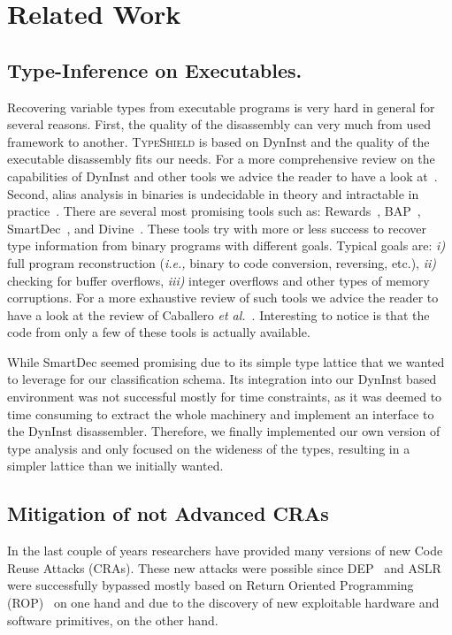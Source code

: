 \section{Related Work}
\label{chapter:Related_Work}

\subsection{Type-Inference on Executables.}
\label{Type-Inference on Executables}
Recovering variable types from executable programs
is very hard in general for several reasons. 
First, the quality of the disassembly can very much from used
framework to another. \textsc{TypeShield} is based on DynInst 
and the quality of the executable disassembly fits our needs. 
For a more comprehensive review on the capabilities of DynInst and other tools we
advice the reader to have a look at~\cite{andriesse:indepth}.
Second, alias analysis in binaries is undecidable in theory and intractable in practice~\cite{alan:mycroft}.
There are several most promising tools such as: Rewards~\cite{lin:rewards}, BAP~\cite{bap:brumley}, 
SmartDec~\cite{fokin:smartdec}, and Divine~\cite{divine:balakrishnan}.
These tools try with more or less success to recover 
type information from binary programs with different goals.
Typical goals are: 
\textit{i)} full program reconstruction (\textit{i.e.,} binary to code conversion, reversing, etc.), 
\textit{ii)} checking for buffer overflows, 
\textit{iii)} integer overflows and other types of memory corruptions.
For a more exhaustive review of such tools we advice the reader to
have a look at the review of Caballero \textit{et al.}~\cite{caballero:inference}.
Interesting to notice is that the code from only a few of these tools is actually available.

While SmartDec seemed promising due to its simple type lattice that we wanted to leverage for our classification schema. 
Its integration into our DynInst based environment was not successful mostly for time constraints, as it was deemed to 
time consuming to extract the whole machinery and implement an interface to the DynInst disassembler.
Therefore, we finally implemented our own version of type analysis and only focused on the wideness of the types, 
resulting in a simpler lattice than we initially wanted.

\subsection{Mitigation of not Advanced CRAs}
\label{Mitigation of Code-Reuse Attacks}
In the last couple of years researchers have provided many versions of new Code Reuse Attacks (CRAs).
These new attacks were possible since DEP~\cite{dep} and ASLR~\cite{ASLR} were successfully bypassed mostly based
on Return Oriented Programming (ROP)~\cite{ROP, kornau:rop, rop:shacham} on one hand and due to the discovery of 
new exploitable hardware and software primitives, on the other hand.

